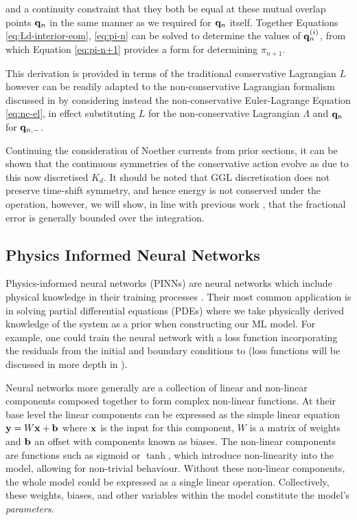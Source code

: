 and a continuity constraint that they both be equal at these mutual overlap points $\vb{q}_n$ in the same manner as we required for $\vb{q}_n$ itself. Together Equations \eqref{eq:Ld-interior-eom}, \eqref{eq:pi-n} can be solved to determine the values of $\vb q^{(i)}_n$, from which Equation \eqref{eq:pi-n+1} provides a form for determining $\pi_{n + 1}$.

This derivation is provided in terms of the traditional conservative Lagrangian $L$ however can be readily adapted to the non-conservative Lagrangian formalism discussed in  by considering instead the non-conservative Euler-Lagrange Equation \eqref{eq:nc-el}, in effect substituting $L$ for the non-conservative Lagrangian $\Lambda$ and $\vb q_n$ for $\vb q_{n, -}$.

Continuing the consideration of Noether currents from prior sections, it can be shown that the continuous symmetries of the conservative action evolve as due to this now discretised $K_d$. It should be noted that GGL discretisation does not preserve time-shift symmetry, and hence energy is not conserved under the operation, however, we will show, in line with previous work \cite{tsangSLIMPLECTICINTEGRATORSVARIATIONAL2015}, that the fractional error is generally bounded over the integration.

\subsection{Physics Informed Neural Networks}
\label{sec:intro-pinn}

Physics-informed neural networks (PINNs) are neural networks which include physical knowledge in their training processes \cite{raissiPhysicsInformedDeep2017}.
Their most common application is in solving partial differential equations (PDEs) \cite{luDeepXDEDeepLearning2021,mengCompositeNeuralNetwork2020} where we take physically derived knowledge of the system as a prior when constructing our ML model. For example, one could train the neural network with a loss function incorporating the residuals from the initial and boundary conditions to (loss functions will be discussed in more depth in ).

Neural networks more generally are a collection of linear and non-linear components composed together to form complex non-linear functions. At their base level the linear components can be expressed as the simple linear equation \(\vb{y} = W\vb{x} + \vb{b}\) where $\vb x$ is the input for this component, $W$ is a matrix of weights and $\vb{b}$ an offset with components known as biases. The non-linear components are functions such as sigmoid or $\tanh$, which introduce non-linearity into the model, allowing for non-trivial behaviour. Without these non-linear components, the whole model could be expressed as a single linear operation. Collectively, these weights, biases, and other variables within the model constitute the model's \emph{parameters}.

